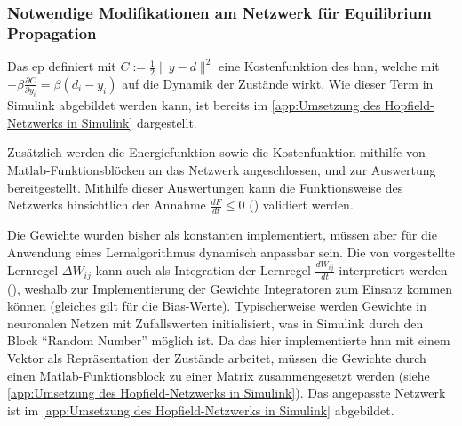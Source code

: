 \subsubsection{Notwendige Modifikationen am Netzwerk für Equilibrium Propagation}

Das \ac{ep} definiert mit \(C:=\frac{1}{2}\| y-d\| ^2\) eine Kostenfunktion des \ac{hnn}, welche mit \(-\beta\frac{\partial C}{\partial y_i}=\beta(d_i-y_i)\) auf die Dynamik der Zustände wirkt. Wie dieser Term in Simulink abgebildet werden kann, ist bereits im \ref{app:Umsetzung des Hopfield-Netzwerks in Simulink} dargestellt.

Zusätzlich werden die Energiefunktion sowie die Kostenfunktion mithilfe von Matlab-Funktionsblöcken an das Netzwerk angeschlossen, und zur Auswertung bereitgestellt. Mithilfe dieser Auswertungen kann die Funktionsweise des Netzwerks hinsichtlich der Annahme \(\frac{dF}{dt}\leq{0}\) (\cite[vgl. S. 3]{Scellier2017}) validiert werden.

Die Gewichte wurden bisher als konstanten implementiert, müssen aber für die Anwendung eines Lernalgorithmus dynamisch anpassbar sein. Die von \citeauthor{Scellier2017} vorgestellte Lernregel \(\Delta W_{ij}\) kann auch als Integration der Lernregel \(\frac{dW_{ij}}{dt}\) interpretiert werden (\cite[vgl. S. 5]{Scellier2017}), weshalb zur Implementierung der Gewichte Integratoren zum Einsatz kommen können (gleiches gilt für die Bias-Werte). Typischerweise werden Gewichte in neuronalen Netzen mit Zufallswerten initialisiert, was in Simulink durch den Block "`Random Number"' möglich ist. Da das hier implementierte \ac{hnn} mit einem Vektor als Repräsentation der Zustände arbeitet, müssen die Gewichte durch einen Matlab-Funktionsblock zu einer Matrix zusammengesetzt werden (siehe \ref{app:Umsetzung des Hopfield-Netzwerks in Simulink}). Das angepasste Netzwerk ist im \ref{app:Umsetzung des Hopfield-Netzwerks in Simulink} abgebildet.

